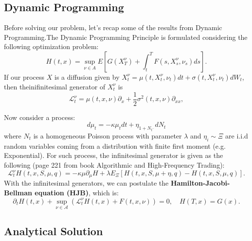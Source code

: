 \subsection{Dynamic Programming}
Before solving our problem, let's recap some of the results from Dynamic Programming.The Dynamic Programming Principle is formulated considering the following optimization problem:
\begin{displaymath}
	H(t,x) = \sup_{\nu \in A} E \left[
	G(X^\nu_T) + \int^T_t F(s,X^\nu_s, \nu_s) ds
	\right].
\end{displaymath}
If our process $X$ is a diffusion given by $X_t^\nu = \mu(t,X^\nu_t, \nu_t) dt  + \sigma(t,X^\nu_t, \nu_t) dW_t$, then theinifinitesimal generator of $X^\nu_t$ is
\begin{displaymath}
	\mathcal L^\nu_t = \mu(t,x,\nu) \partial_x + \frac{1}{2}\sigma^2(t,x,\nu) \partial_{xx},
\end{displaymath}

Now consider a process:
\begin{displaymath}
	d\mu_t = -\kappa \mu_t dt + \eta_{1+N_{t^-}} dN_t
\end{displaymath}
where $N_t$ is a homogeneous Poisson process with parameter $\lambda$ and
$\eta_i \sim \Xi$ are i.i.d random variables
coming from a distribution with finite first moment (e.g. Exponential).
For such process, the
infinitesimal generator is given as the following (page 221 from book Algorithmic and High-Frequency Trading):
\begin{displaymath}
	\mathcal L^\nu_t H(t,x,S,\mu,q) = -\kappa \mu\partial_\mu H + \lambda E_\Xi[H(t,x, S, \mu+\eta,q) - H(t,x,S,\mu,q)].
\end{displaymath}
With the infinitesimal generators, we can postulate the \textbf{Hamilton-Jacobi-Bellman equation (HJB)}, which is:
\begin{displaymath}
	\partial_t H(t,x) +  \sup_{\nu \in \mathcal A}(\mathcal L^\nu_t H(t,x) + F(t,x,\nu)) = 0, \quad H(T,x) = G(x).
\end{displaymath}

\subsection{Analytical Solution}

